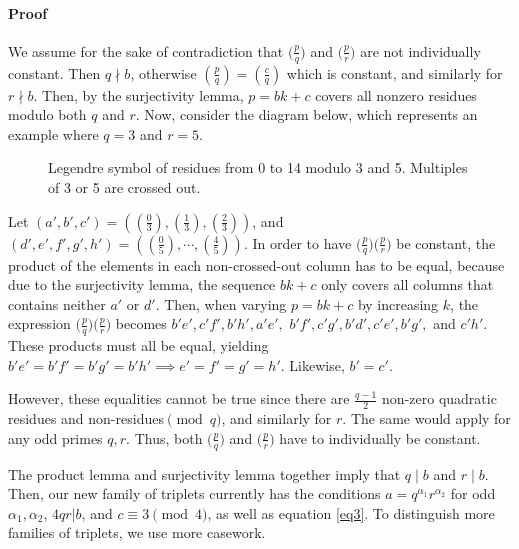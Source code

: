 \documentclass{article}
\newcommand{\al}{\alpha}
\newcommand{\qrB}[2]{\Big( \frac{#1}{#2}\Big)}
\newcommand{\qrn}[2]{\left( \frac{#1}{#2}\right)}
\begin{document}
\paragraph{Proof}
We assume for the sake of contradiction that $\qrB{p}{q}$ and $\qrB{p}{r}$ are not individually constant. Then $q \nmid b$, otherwise $\qrn{p}{q}=\qrn{c}{q}$ which is constant, and similarly for $r\nmid b$. Then, by the surjectivity lemma, $p=bk+c$ covers all nonzero residues modulo both $q$ and $r$. Now, consider the diagram below, which represents an example where $q=3$ and $r=5$.
\begin{figure}[H]
    \centering
    \caption{Legendre symbol of residues from 0 to 14 modulo 3 and 5. Multiples of 3 or 5 are crossed out.}
\end{figure}
Let $(a', b', c') = (\qrn{0}{3}, \qrn{1}{3}, \qrn{2}{3})$, and $(d', e', f', g', h') = (\qrn{0}{5}, \cdots, \qrn{4}{5})$. In order to have $\qrB{p}{q}\qrB{p}{r}$ be constant, the product of the elements in each non-crossed-out column has to be equal, because due to the surjectivity lemma, the sequence $bk+c$ only covers all columns that contains neither $a'$ or $d'$. Then, when varying $p=bk+c$ by increasing $k$, the expression $\qrB{p}{q}\qrB{p}{r}$ becomes $b'e', c'f', b'h', a'e',$ $b'f', c'g', b'd', c'e', b'g',$ and $c'h'$. These products must all be equal, yielding $b'e'=b'f'=b'g'=b'h' \implies e'=f'=g'=h'$. Likewise, $b'=c'$.

However, these equalities cannot be true since there are $\frac{q-1}{2}$ non-zero quadratic residues and non-residues$\pmod q$, and similarly for $r$. The same would apply for any odd primes $q, r$. Thus, both $\qrB{p}{q}$ and $\qrB{p}{r}$ have to individually be constant. \qedsymbol

The product lemma and surjectivity lemma together imply that $q \mid b$ and $r \mid b$. Then, our new family of triplets currently has the conditions $a=q^{\al_1}r^{\al_2}$ for odd $\al_1, \al_2$, $4qr | b$, and $c \equiv 3 \pmod 4$, as well as equation \ref{eq3}. To distinguish more families of triplets, we use more casework. 
\end{document}
